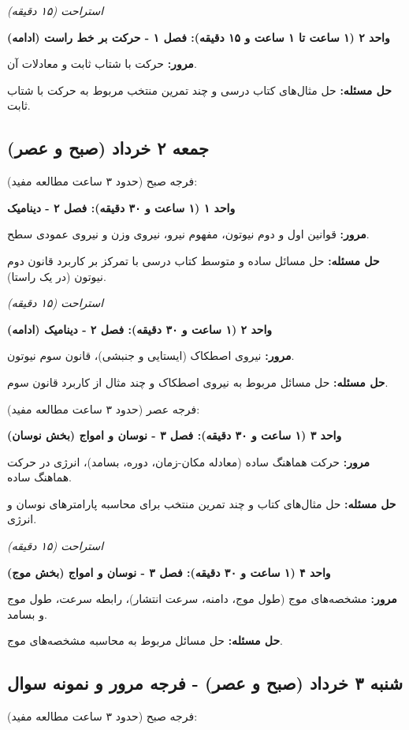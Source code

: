 \documentclass[12pt]{article}
\newcommand{\unithead}[1]{\par\vspace{1ex}\noindent\textbf{#1}\par\nopagebreak[4]\vspace{0.5ex}}
\newcommand{\休息}[1]{\par\centering\textit{#1}\par\vspace{1ex}} %
\begin{document}
\休息{استراحت (۱۵ دقیقه)}

\unithead{واحد ۲ (۱ ساعت تا ۱ ساعت و ۱۵ دقیقه): فصل ۱ - حرکت بر خط راست (ادامه)}
\noindent\textbf{مرور: }حرکت با شتاب ثابت و معادلات آن.
\par\noindent\textbf{حل مسئله: }حل مثال‌های کتاب درسی و چند تمرین منتخب مربوط به حرکت با شتاب ثابت.

\subsection*{جمعه ۲ خرداد (صبح و عصر)}
فرجه صبح (حدود ۳ ساعت مطالعه مفید):

\unithead{واحد ۱ (۱ ساعت و ۳۰ دقیقه): فصل ۲ - دینامیک}
\noindent\textbf{مرور: }قوانین اول و دوم نیوتون، مفهوم نیرو، نیروی وزن و نیروی عمودی سطح.
\par\noindent\textbf{حل مسئله: }حل مسائل ساده و متوسط کتاب درسی با تمرکز بر کاربرد قانون دوم نیوتون (در یک راستا).

\休息{استراحت (۱۵ دقیقه)}

\unithead{واحد ۲ (۱ ساعت و ۳۰ دقیقه): فصل ۲ - دینامیک (ادامه)}
\noindent\textbf{مرور: }نیروی اصطکاک (ایستایی و جنبشی)، قانون سوم نیوتون.
\par\noindent\textbf{حل مسئله: }حل مسائل مربوط به نیروی اصطکاک و چند مثال از کاربرد قانون سوم.

\vspace{1em}
فرجه عصر (حدود ۳ ساعت مطالعه مفید):

\unithead{واحد ۳ (۱ ساعت و ۳۰ دقیقه): فصل ۳ - نوسان و امواج (بخش نوسان)}
\noindent\textbf{مرور: }حرکت هماهنگ ساده (معادله مکان-زمان، دوره، بسامد)، انرژی در حرکت هماهنگ ساده.
\par\noindent\textbf{حل مسئله: }حل مثال‌های کتاب و چند تمرین منتخب برای محاسبه پارامترهای نوسان و انرژی.

\休息{استراحت (۱۵ دقیقه)}

\unithead{واحد ۴ (۱ ساعت و ۳۰ دقیقه): فصل ۳ - نوسان و امواج (بخش موج)}
\noindent\textbf{مرور: }مشخصه‌های موج (طول موج، دامنه، سرعت انتشار)، رابطه سرعت، طول موج و بسامد.
\par\noindent\textbf{حل مسئله: }حل مسائل مربوط به محاسبه مشخصه‌های موج.

\subsection*{شنبه ۳ خرداد (صبح و عصر) - فرجه مرور و نمونه سوال}
فرجه صبح (حدود ۳ ساعت مطالعه مفید):
\end{document}

